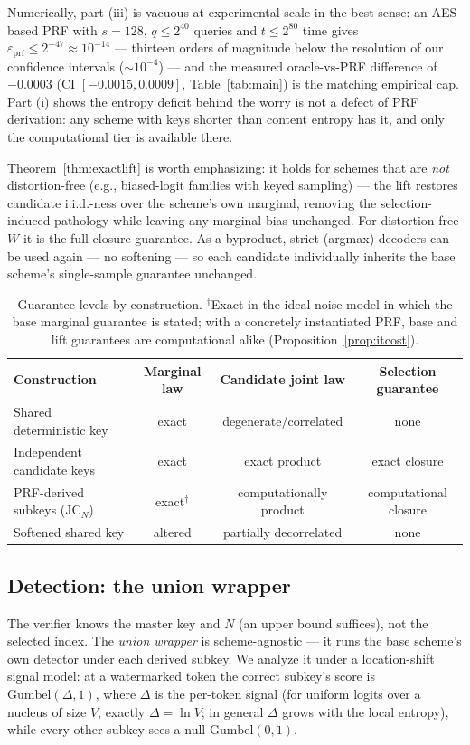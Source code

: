 \documentclass{article} %
\begin{document}
Numerically, part (iii) is vacuous at experimental scale in the best sense:
an AES-based PRF with $s{=}128$, $q\le2^{40}$ queries and $t\le2^{80}$ time
gives $\varepsilon_{\mathrm{prf}}\le2^{-47}\approx10^{-14}$ --- thirteen
orders of magnitude below the resolution of our confidence intervals
($\sim10^{-4}$) --- and the measured oracle-vs-PRF difference of $-0.0003$
(CI $[-0.0015,0.0009]$, Table~\ref{tab:main}) is the matching empirical cap.
Part (i) shows the entropy deficit behind the worry is not a defect of PRF
derivation: any scheme with keys shorter than content entropy has it, and
only the computational tier is available there.

Theorem~\ref{thm:exactlift} is worth emphasizing: it holds for schemes that
are \emph{not} distortion-free (e.g., biased-logit families with keyed
sampling) --- the lift restores candidate i.i.d.-ness over the scheme's own
marginal, removing the selection-induced pathology while leaving any marginal
bias unchanged. For distortion-free $W$ it is the full closure guarantee. As a
byproduct, strict (argmax) decoders can be used again --- no softening --- so
each candidate individually inherits the base scheme's single-sample guarantee
unchanged.

\begin{table}[h]
\caption{Guarantee levels by construction. $^{\dagger}$Exact in the
ideal-noise model in which the base marginal guarantee is stated; with a
concretely instantiated PRF, base and lift guarantees are computational
alike (Proposition~\ref{prop:itcost}).}
\label{tab:tiers}
\begin{center}
\small
\begin{tabular}{lccc}
\toprule
Construction & Marginal law & Candidate joint law & Selection guarantee \\
\midrule
Shared deterministic key & exact & degenerate/correlated & none \\
Independent candidate keys & exact & exact product & exact closure \\
PRF-derived subkeys ($\mathrm{JC}_N$) & exact$^{\dagger}$ & computationally product & computational closure \\
Softened shared key & altered & partially decorrelated & none \\
\bottomrule
\end{tabular}
\end{center}
\end{table}

\subsection{Detection: the union wrapper}\label{sec:detection}
The verifier knows the master key and $N$ (an upper bound suffices), not the
selected index. The \emph{union wrapper} is scheme-agnostic --- it runs the base
scheme's own detector under each derived subkey. We analyze it under a
location-shift signal model:
at a watermarked token the correct subkey's score is
$\mathrm{Gumbel}(\Delta,1)$, where $\Delta$ is the per-token signal (for uniform
logits over a nucleus of size $V$, exactly $\Delta=\ln V$; in general $\Delta$
grows with the local entropy), while every other subkey sees a null
$\mathrm{Gumbel}(0,1)$.
\end{document}
